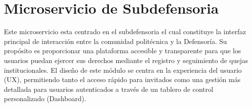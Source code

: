 
\section{Microservicio de Subdefensoria}
\label{sec:modulo_subdefensoria}

Este microservicio esta centrado en el subdefensoria el cual constituye la interfaz principal de interacción entre la comunidad politécnica y la Defensoría. 
Su propósito es proporcionar una plataforma accesible y transparente para que los usuarios puedan ejercer sus derechos mediante el registro y seguimiento de quejas institucionales. El diseño de este módulo se centra en la experiencia del usuario (UX), permitiendo tanto el acceso rápido para invitados como una gestión más detallada para usuarios autenticados a través de un tablero de control personalizado (Dashboard).


%
%
%
%